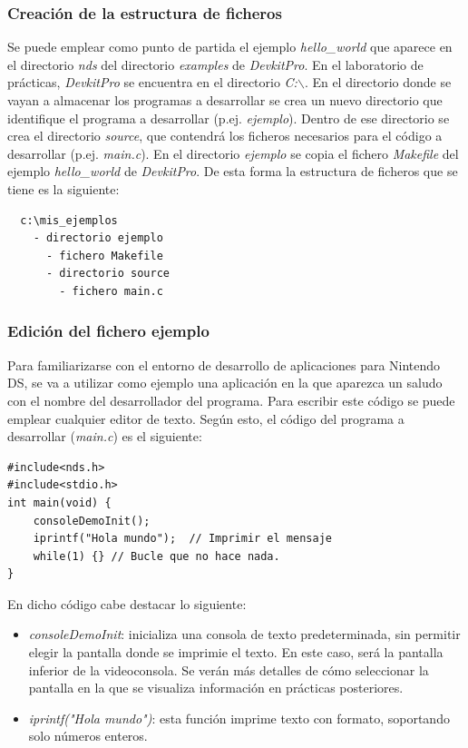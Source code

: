 \subsubsection{Creación de la estructura de ficheros}
Se puede emplear como punto de partida el ejemplo  \textit{hello\_world} que aparece en el directorio \textit{nds} del directorio \textit{examples} de  \textit{DevkitPro}. En  el laboratorio de prácticas, \textit{DevkitPro} se encuentra en el directorio \textit{C:$\backslash$}. En el directorio donde se vayan a almacenar los  programas a desarro\-llar se crea un nuevo directorio que identifique el programa a desarrollar (p.ej. \textit{ejemplo}). Dentro de ese directorio se crea el directorio \textit{source}, que contendrá los ficheros necesarios para el código a desarrollar (p.ej. \textit{main.c}). En el directorio \textit{ejemplo} se copia el fichero \textit{Makefile} del  ejemplo  \textit{hello\_world} de \textit{DevkitPro}. De esta forma la estructura de ficheros que se tiene es la siguiente:

{\scriptsize
 \begin{verbatim}
  c:\mis_ejemplos
    - directorio ejemplo
      - fichero Makefile
      - directorio source
        - fichero main.c
\end{verbatim}
}

\subsubsection{Edición del fichero ejemplo}
Para familiarizarse con el entorno de desarrollo de aplicaciones para Nintendo DS, se va a utilizar como ejemplo una aplicación en la que aparezca un saludo con el nombre del desarrollador del programa. Para escribir este código se puede emplear cualquier editor de texto. Según esto, el código del programa a desarrollar (\textit{main.c}) es el siguiente:

\begin{lstlisting}
#include<nds.h>
#include<stdio.h>
int main(void) {
    consoleDemoInit();
    iprintf("Hola mundo");  // Imprimir el mensaje 
    while(1) {} // Bucle que no hace nada.     
}
\end{lstlisting}

En dicho código cabe destacar lo siguiente:
\begin{itemize}
\item \textit{consoleDemoInit}: inicializa una consola de texto predeterminada, sin permitir elegir la pantalla donde se imprimie el texto. En este caso, será la pantalla inferior de la videoconsola. Se verán más detalles de cómo seleccionar la pantalla en la que se visualiza información en prácticas posteriores. 
%
\item  \textit{iprintf("Hola mundo")}: esta función imprime texto con formato, soportando solo números enteros.
\end{itemize}

